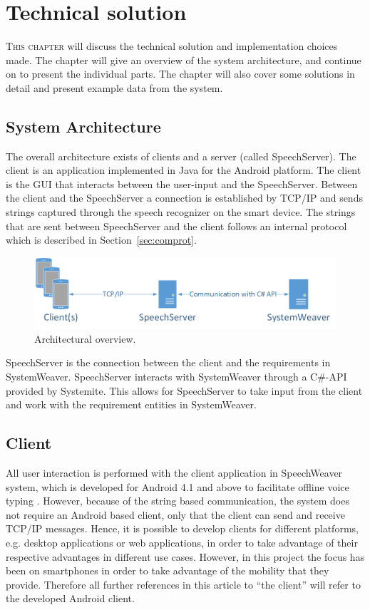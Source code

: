 \chapter{Technical solution}
\label{cha:techsol}
\lettrine[lines=4, loversize=-0.1, lraise=0.1]{T}{his chapter} will discuss the technical solution and implementation choices made. The chapter will give an overview of the system architecture, and continue on to present the individual parts. The chapter will also cover some solutions in detail and present example data from the system.

\section{System Architecture}
The overall architecture exists of clients and a server (called SpeechServer). The client is an application implemented in Java for the Android platform. The client is the GUI that interacts between the user-input and the SpeechServer. Between the client and the SpeechServer a connection is established by TCP/IP and sends strings captured through the speech recognizer on the smart device. The strings that are sent between SpeechServer and the client follows an internal protocol which is described in Section~\ref{sec:comprot}.

\begin{figure}[h]
\centering
\includegraphics[width = 400pt, keepaspectratio = true]{fig/SystemOverview}
\caption{Architectural overview.}
\label{fig:archoverview}
\end{figure}
\FloatBarrier
SpeechServer is the connection between the client and the requirements in SystemWeaver. SpeechServer interacts with SystemWeaver through a C\#-API provided by Systemite. This allows for SpeechServer to take input from the client and work with the requirement entities in SystemWeaver.

\section{Client}
All user interaction is performed with the client application in SpeechWeaver system, which is developed for Android 4.1 and above to facilitate offline voice typing \citep{offlvoice}.  However, because of the string based communication, the system does not require an Android based client, only that the client can send and receive TCP/IP messages.
Hence, it is possible to develop clients for different platforms, e.g. desktop applications or web applications, in order to take advantage of their respective advantages in different use cases.
However, in this project the focus has been on smartphones in order to take advantage of the mobility that they provide.
Therefore all further references in this article to ``the client''  will refer to the developed Android client.

